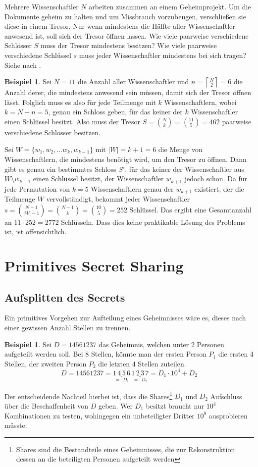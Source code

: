 \documentclass[12pt, a4paper, oneside, titlepage]{report}
\theoremstyle{definition}
\newtheorem{bsp}[lemma]{Beispiel}
\begin{document}
	Mehrere Wissenschaftler $ N $ arbeiten zusammen an einem Geheimprojekt. Um die Dokumente geheim zu halten und um Missbrauch vorzubeugen, verschließen sie diese in einem Tresor. Nur wenn mindestens die Hälfte aller Wissenschaftler anwesend ist, soll sich der Tresor öffnen lassen. Wie viele paarweise verschiedene Schlösser $ S $ muss der Tresor mindestens besitzen? Wie viele paarweise verschiedene Schlüssel $ s $ muss jeder Wissenschaftler mindestens bei sich tragen? Siehe \cite{shamir} nach \cite{liu}.
	
	\begin{bsp}
		Sei $ N = 11 $ die Anzahl aller Wissenschaftler und $ n = \left\lceil\frac{N}{2} \right\rceil = 6 $ die Anzahl derer, die mindestens anwesend sein müssen, damit sich der Tresor öffnen lässt. Folglich muss es also für jede Teilmenge mit $ k $ Wissenschaftlern, wobei $ k = N - n = 5 $, genau ein Schloss geben, für das keiner der $ k $ Wissenschaftler einen Schlüssel besitzt. Also muss der Tresor $ S = \binom{N}{k} = \binom{11}{5} = 462 $ paarweise verschiedene Schlösser besitzen.
		
		Sei $ W = \{w_1, w_2, \dots w_k, w_{k+1}\} $ mit $ |W| = k + 1 = 6 $ die Menge von Wissenschaftlern, die mindestens benötigt wird, um den Tresor zu öffnen. Dann gibt es genau ein bestimmtes Schloss $ S' $, für das keiner der Wissenschaftler aus $ W \setminus w_{k+1} $ einen Schlüssel besitzt, der Wissenschaftler $ w_{k+1} $ jedoch schon. Da für jede Permutation von $ k = 5 $ Wissenschaftlern genau der $ w_{k+1} $ existiert, der die Teilmenge $ W $ \glqq vervollständigt\grqq, bekommt jeder Wissenschaftler $ s = \binom{N-1}{|W|-1} = \binom{N-1}{k} = \binom{10}{5} = 252 $ Schlüssel. Das ergibt eine Gesamtanzahl an $ 11 \cdot 252 = 2772 $ Schlüsseln. Dass dies keine praktikable Lösung des Problems ist, ist offensichtlich.
	\end{bsp}
	\section{Primitives Secret Sharing}
	\subsection{Aufsplitten des Secrets}
		Ein primitives Vorgehen zur Aufteilung eines Geheimnisses wäre es, dieses nach einer gewissen Anzahl Stellen zu trennen.
		\begin{bsp}
			Sei $ D = 14561237 $ das Geheimnis, welchen unter 2 Personen aufgeteilt werden soll. Bei 8 Stellen, könnte man der ersten Person $ P_1 $ die ersten 4 Stellen, der zweiten Person $ P_2 $ die letzten 4 Stellen zuteilen.
			$$ D = 14561237 = \underset{=:D_1}{\underline{1\,4\,5\,6}} \, \underset{=:D_2}{\underline{1\,2\,3\,7}} = D_1 \cdot 10^4 + D_2 $$
		\end{bsp}
		Der entscheidende Nachteil hierbei ist, dass die Shares\footnote{Shares sind die Bestandteile eines Geheimnisses, die zur Rekonstruktion dessen an die beteiligten Personen aufgeteilt werden} $ D_1 $ und $ D_2 $ Aufschluss über die Beschaffenheit von $ D $ geben. Wer $ D_1 $ besitzt braucht nur $ 10^4 $ Kombinationen zu testen, wohingegen ein unbeteiligter Dritter $ 10^8 $ ausprobieren müsste.
		
\end{document}
